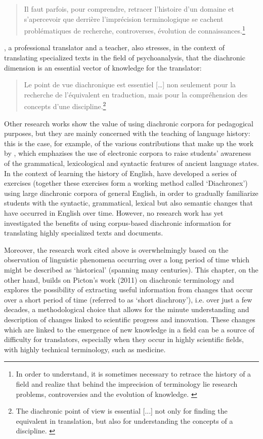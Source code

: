 \documentclass[output=paper]{langscibook}
\begin{document}
\begin{quote}
Il faut parfois, pour comprendre, retracer l’histoire d’un domaine et s’aper\-ce\-voir que derrière l’imprécision terminologique se cachent problématiques de recherche, controverses, évolution de connaissances.\footnote{In order to understand, it is sometimes necessary to retrace the history of a field and realize that behind the imprecision of terminology lie research problems, controversies and the evolution of knowledge. \citep[315]{Vandaele1999}} \citep[315]{Vandaele1999}
\end{quote}

\citet{Gentile2006}, a professional translator and a teacher, also stresses, in the context of translating specialized texts in the field of psychoanalysis, that the diachronic dimension is an essential vector of knowledge for the translator:

\begin{quote}
Le point de vue diachronique est essentiel […] non seulement pour la recherche de l’équivalent en traduction, mais pour la compréhension des concepts d’une discipline.\footnote{The diachronic point of view is essential [...] not only for finding the equivalent in translation, but also for understanding the concepts of a discipline. \citep[128]{Gentile2006}} \citep[128]{Gentile2006}
\end{quote}

Other research works show the value of using diachronic corpora for pedagogical purposes, but they are mainly concerned with the teaching of language history: this is the case, for example, of the various contributions that make up the work by  \citet{KawagachiEtAl2011}, which emphazises the use of electronic corpora to raise students’ awareness of the grammatical, lexicological and syntactic features of ancient language states. In the context of learning the history of English, \citet{HeremansCuyckens2012} have developed a series of exercises (together these exercises form a working method called ‘Diachronex’) using large diachronic corpora of general English, in order to gradually familiarize students with the syntactic, grammatical, lexical but also semantic changes that have occurred in English over time. However, no research work has yet investigated the benefits of using corpus-based diachronic information for translating highly specialized texts and documents.

Moreover, the research work cited above is overwhelmingly based on the observation of linguistic phenomena occurring over a long period of time which might be described as ‘historical’ (spanning many centuries). This chapter, on the other hand, builds on Picton’s work (2011) on diachronic terminology and explores the possibility of extracting useful information from changes that occur over a short period of time (referred to as ‘short diachrony’), i.e. over just a few decades, a methodological choice that allows for the minute understanding and description of changes linked to scientific progress and innovation. These changes which are linked to the emergence of new knowledge in a field can be a source of difficulty for translators, especially when they occur in highly scientific fields, with highly technical terminology, such as medicine.
\end{document}
